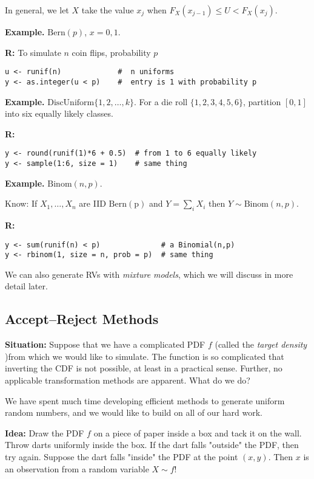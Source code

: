 \documentclass[11pt,english]{scrbook}
\begin{document}
\begin{enumerate}
In general, we let \(X\) take the value \(x_{j}\) when \(F_{X}(x_{j-1})\leq U<F_{X}(x_{j})\).

\textbf{Example.} \(\mathrm{Bern}(p)\), \(x=0,1\).

\textbf{R:} To simulate \(n\) coin flips, probability \(p\)

\begin{verbatim}
u <- runif(n)             #  n uniforms
y <- as.integer(u < p)    #  entry is 1 with probability p 
\end{verbatim}


\textbf{Example.} \(\mathrm{DiscUniform}\{1,2,\ldots,k\}\).  For a die roll \(\{1,2,3,4,5,6\}\), partition \([0,1]\) into six equally likely classes.

\textbf{R:}
\begin{verbatim}
y <- round(runif(1)*6 + 0.5)  # from 1 to 6 equally likely
y <- sample(1:6, size = 1)    # same thing
\end{verbatim}


\textbf{Example.} \(\mathrm{Binom}(n,p)\).

Know: If \(X_{1},\ldots,X_{n}\) are IID \(\mathrm{Bern(p)}\) and \(Y=\sum_{i}X_{i}\) then \(Y\sim\mathrm{Binom}(n,p)\).

\textbf{R:}
\begin{verbatim}
y <- sum(runif(n) < p)              # a Binomial(n,p)
y <- rbinom(1, size = n, prob = p)  # same thing
\end{verbatim}

We can also generate RVs with \emph{mixture models}, which we will discuss in more detail later.
\end{enumerate}

\subsection{Accept--Reject Methods}
\label{sec:orgbb3a5f1}

\textbf{Situation:} Suppose that we have a complicated PDF \(f\) (called the \emph{target density} )from which we would like to simulate. The function is so complicated that inverting the CDF is not possible, at least in a practical sense. Further, no applicable transformation methods are apparent. What do we do?

We have spent much time developing efficient methods to generate uniform random numbers, and we would like to build on all of our hard work.

\textbf{Idea:} Draw the PDF \(f\) on a piece of paper inside a box and tack it on the wall. Throw darts uniformly inside the box. If the dart falls "outside" the PDF, then try again. Suppose the dart falls "inside" the PDF at the point \((x,y)\). Then \(x\) is an observation from a random variable \(X\sim f\)!
\end{document}
